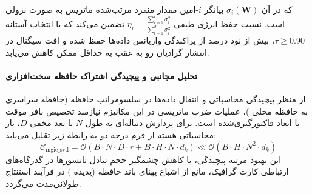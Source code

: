 که در آن $\sigma_i(\mathbf{W})$ بیانگر $i$-امین مقدار منفرد مرتب‌شده ماتریس به صورت نزولی است. نسبت حفظ انرژی طیفی $\eta_r = \frac{\sum_{i=1}^r \sigma_i^2}{\sum_{i=1}^{d} \sigma_i^2}$ تضمین می‌کند که با انتخاب آستانه $\tau \ge 0.90$، بیش از نود درصد از پراکندگی واریانس داده‌ها حفظ شده و افت سیگنال در انتشار گرادیان رو به عقب به حداقل ممکن کاهش می‌یابد.

\paragraph{تحلیل مجانبی و پیچیدگی اشتراک حافظه سخت‌افزاری}
از منظر پیچیدگی محاسباتی و انتقال داده‌ها در سلسومراتب حافظه (حافظه سراسری  به حافظه محلی )، عملیات ضرب ماتریسی در این مکانیزم نیازمند تخصیص بافر موقت با ابعاد فاکتورگیری‌شده است. برای پردازش دنباله‌ای به طول $N$ با بعد مخفی $D$، بار محاسباتی هسته از فرم درجه دو به رابطه زیر تقلیل می‌یابد:
\begin{equation}
\label{eq:complexity_mgie_svd}
\mathcal{C}_{\text{mgie\_svd}} = \mathcal{O}\left( B \cdot N \cdot D \cdot r + B \cdot H \cdot N \cdot d_k \right) \ll \mathcal{O}\left( B \cdot H \cdot N^2 \cdot d_k \right)
\end{equation}
این بهبود مرتبه پیچیدگی، با کاهش چشمگیر حجم تبادل تانسورها در گذرگاه‌های ارتباطی کارت گرافیک، مانع از اشباع پهنای باند حافظه (پدیده ) در فرآیند استنتاج طولانی‌مدت می‌گردد.
